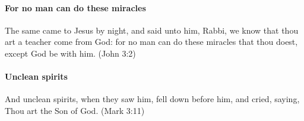 \paragraph{For no man can do these miracles}
The same came to Jesus by night, and said unto him, Rabbi, we know that thou art a teacher come from God: for no man can do these miracles that thou doest, except God be with him. (John 3:2)

\paragraph{Unclean spirits}
And unclean spirits, when they saw him, fell down before him, and cried, saying, Thou art the Son of God. (Mark 3:11)
